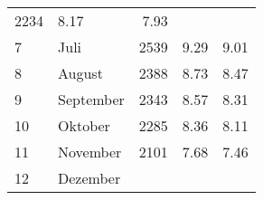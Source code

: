 \begin{longtable}{lXrrr}
       \num{2234} &
       \num[round-mode=places,round-precision=2]{8,17} &
         \num[round-mode=places,round-precision=2]{7,93} \\

     7 &
     \multicolumn{1}{X}{ Juli   } &


       \num{2539} &
       \num[round-mode=places,round-precision=2]{9,29} &
         \num[round-mode=places,round-precision=2]{9,01} \\

     8 &
     \multicolumn{1}{X}{ August   } &


       \num{2388} &
       \num[round-mode=places,round-precision=2]{8,73} &
         \num[round-mode=places,round-precision=2]{8,47} \\

     9 &
     \multicolumn{1}{X}{ September   } &


       \num{2343} &
       \num[round-mode=places,round-precision=2]{8,57} &
         \num[round-mode=places,round-precision=2]{8,31} \\

     10 &
     \multicolumn{1}{X}{ Oktober   } &


       \num{2285} &
       \num[round-mode=places,round-precision=2]{8,36} &
         \num[round-mode=places,round-precision=2]{8,11} \\

     11 &
     \multicolumn{1}{X}{ November   } &


       \num{2101} &
       \num[round-mode=places,round-precision=2]{7,68} &
         \num[round-mode=places,round-precision=2]{7,46} \\

     12 &
     \multicolumn{1}{X}{ Dezember   } &



\end{longtable}
